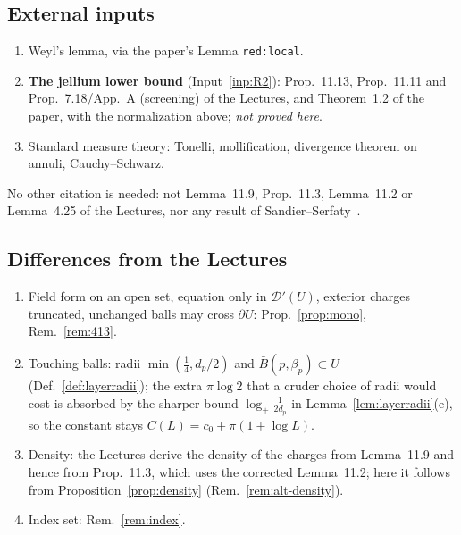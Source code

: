 \documentclass[11pt]{article}
\theoremstyle{definition}
\theoremstyle{remark}
\newcommand{\logp}{\log_+}
\begin{document}
\subsection{External inputs}
\begin{enumerate}[label=(E\arabic*)]
\item Weyl's lemma, via the paper's Lemma \texttt{red:local}.
\item \textbf{The jellium lower bound} (Input~\ref{inp:R2}): Prop.~11.13, Prop.~11.11 and Prop.~7.18/App.~A (screening) of the Lectures, and Theorem~1.2 of the paper, with the normalization above; \emph{not proved here}.
\item Standard measure theory: Tonelli, mollification, divergence theorem on annuli, Cauchy--Schwarz.
\end{enumerate}
No other citation is needed: not Lemma~11.9, Prop.~11.3, Lemma~11.2 or Lemma~4.25 of the Lectures, nor any result of Sandier--Serfaty~\cite{SandierSerfaty2012}.

\subsection{Differences from the Lectures}
\begin{enumerate}
\item Field form on an open set, equation only in $\mathcal D'(U)$, exterior charges truncated, unchanged balls may cross $\partial U$: Prop.~\ref{prop:mono}, Rem.~\ref{rem:413}.
\item Touching balls: radii $\min(\frac14,d_p/2)$ and $\bar B(p,\beta_p)\subset U$ (Def.~\ref{def:layerradii}); the extra $\pi\log2$ that a cruder choice of radii would cost is absorbed by the sharper bound $\logp\frac1{2d_p}$ in Lemma~\ref{lem:layerradii}(e), so the constant stays $C(L)=c_0+\pi(1+\log L)$.
\item Density: the Lectures derive the density of the charges from Lemma~11.9 and hence from Prop.~11.3, which uses the corrected Lemma~11.2; here it follows from Proposition~\ref{prop:density} (Rem.~\ref{rem:alt-density}).
\item Index set: Rem.~\ref{rem:index}.
\end{enumerate}
\end{document}
